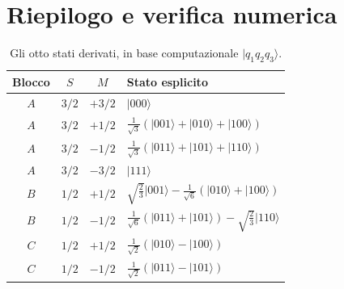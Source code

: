 \documentclass[11pt,a4paper]{article}
\newcommand{\ket}[1]{\lvert #1\rangle}
\begin{document}
\section{Riepilogo e verifica numerica}

\begin{table}[h]
\centering
\renewcommand{\arraystretch}{1.5}
\begin{tabular}{@{}cccl@{}}
\toprule
Blocco & $S$ & $M$ & Stato esplicito \\
\midrule
\rowcolor{colA!8} $A$ & $3/2$ & $+3/2$ & $\ket{000}$\\
\rowcolor{colA!8} $A$ & $3/2$ & $+1/2$ & $\tfrac{1}{\sqrt3}(\ket{001}+\ket{010}+\ket{100})$\\
\rowcolor{colA!8} $A$ & $3/2$ & $-1/2$ & $\tfrac{1}{\sqrt3}(\ket{011}+\ket{101}+\ket{110})$\\
\rowcolor{colA!8} $A$ & $3/2$ & $-3/2$ & $\ket{111}$\\
\rowcolor{colB!8} $B$ & $1/2$ & $+1/2$ & $\sqrt{\tfrac23}\ket{001}-\tfrac{1}{\sqrt6}(\ket{010}+\ket{100})$\\
\rowcolor{colB!8} $B$ & $1/2$ & $-1/2$ & $\tfrac{1}{\sqrt6}(\ket{011}+\ket{101})-\sqrt{\tfrac23}\ket{110}$\\
\rowcolor{colC!8} $C$ & $1/2$ & $+1/2$ & $\tfrac{1}{\sqrt2}(\ket{010}-\ket{100})$\\
\rowcolor{colC!8} $C$ & $1/2$ & $-1/2$ & $\tfrac{1}{\sqrt2}(\ket{011}-\ket{101})$\\
\bottomrule
\end{tabular}
\caption{Gli otto stati derivati, in base computazionale $\ket{q_1q_2q_3}$.}
\label{tab:stati}
\end{table}
\end{document}
